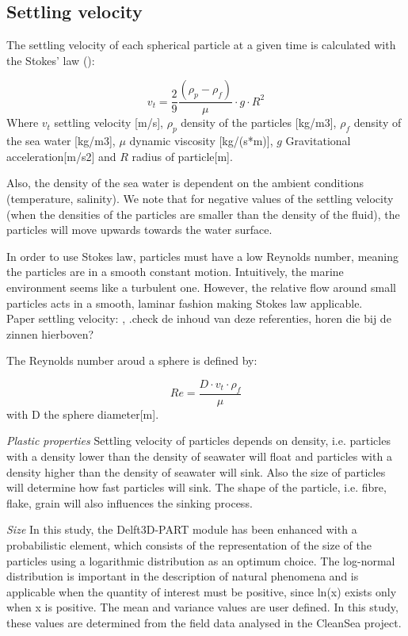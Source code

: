 \documentclass[english]{deltares_manual}
\begin{document}
\subsection{Settling velocity}
The settling velocity of each spherical particle at a given time is calculated with the Stokes’ law (\cite{Shearer2008}):

\begin{equation}\label{xx}
	v_{t} = \frac{2}{9}\frac{(\rho_p - \rho_f)}{\mu}\cdot g \cdot R^2
\end{equation}
Where 	       
$v_{t}$ settling velocity [m/s],
$\rho_{p}$ density of the particles [kg/m3],
$\rho_{f}$ density of the sea water [kg/m3],
$\mu$ dynamic viscosity [kg/(s*m)],
$g$ Gravitational acceleration[m/s2] and
$R$ radius of particle[m].

Also, the density of the sea water is dependent on the ambient conditions (temperature, salinity). We note that for negative values of the settling velocity (when the densities of the particles are smaller than the density of the fluid), the particles will move upwards towards the water surface.

In order to use Stokes law, particles must have a low Reynolds number, meaning the particles are in a smooth constant motion. Intuitively, the marine environment seems like a turbulent one. However, the relative flow around small particles acts in a smooth, laminar fashion making Stokes law applicable. \\
Paper settling velocity: \cite{Khatmullina2017}, \cite{Kowalski2016}.{check de inhoud van deze referenties, horen die bij de zinnen hierboven?}

The Reynolds number aroud a sphere is defined by:

\begin{equation}
	Re = \frac{D \cdot v_{t} \cdot \rho_f}{\mu}
\end{equation}
with D the sphere diameter[m].

\textit{Plastic properties}
Settling velocity of particles depends on density, i.e. particles with a density lower than the density of seawater will float and particles with a density higher than the density of seawater will sink. Also the size of particles will determine how fast particles will sink. The shape of the particle, i.e. fibre, flake, grain will also influences the sinking process. 

\textit{Size} 
In this study, the Delft3D-PART module has been enhanced with a probabilistic element, which consists of the representation of the size of the particles using a logarithmic distribution as an optimum choice. The log-normal distribution is important in the description of natural phenomena and is applicable when the quantity of interest must be positive, since ln(x) exists only when x is positive. The mean and variance values are user defined. In this study, these values are determined from the field data analysed in the CleanSea project.
\end{document}
